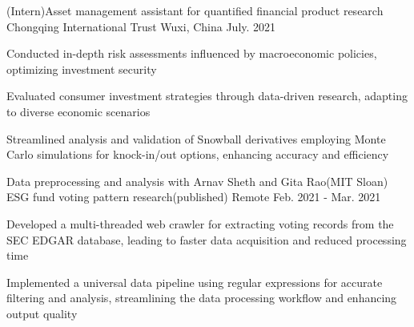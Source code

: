 \begin{cventries}
  \cventry
    {(Intern)Asset management assistant for quantified financial product research}
    {Chongqing International Trust}
    {Wuxi, China}
    {July. 2021}
    {
      \begin{cvitems}
        \item {Conducted in-depth risk assessments influenced by macroeconomic policies, optimizing investment security}
        \item {Evaluated consumer investment strategies through data-driven research, adapting to diverse economic scenarios}
        \item {Streamlined analysis and validation of Snowball derivatives employing Monte Carlo simulations for knock-in/out options, enhancing accuracy and efficiency}
      \end{cvitems}
    }

  \begin{comment}
  \cventry
    {(Intern)Investment assistant for tech industry research and investment strategies}
    {Addor Capital}
    {Nanjing, China}
    {May. 2021 - Jun. 2021}
    {
      \begin{cvitems}
        \item {Conducted, transcribed, and evaluated in-person and virtual interviews, presenting key insights to stakeholders}
        \item {Assessed potential fraud risks pre-financial due diligence through comprehensive research, mitigating financial exposure}
        \item {Measured and assessed Cyber Range industry performance employing DCF and linear regression methodologies, driving strategic decision-making}
      \end{cvitems}
    }
  \end{comment}

  \cventry
    {Data preprocessing and analysis with Arnav Sheth and Gita Rao(MIT Sloan)}
    {ESG fund voting pattern research(published)}
    {Remote}
    {Feb. 2021 - Mar. 2021}
    {
      \begin{cvitems}
        \item {Developed a multi-threaded web crawler for extracting voting records from the SEC EDGAR database, leading to faster data acquisition and reduced processing time}
        \item {Implemented a universal data pipeline using regular expressions for accurate filtering and analysis, streamlining the data processing workflow and enhancing output quality}
      \end{cvitems}
    }
  

\end{cventries}
